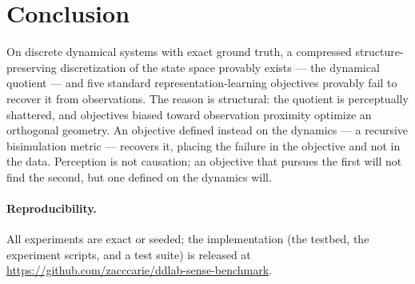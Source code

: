 \documentclass[11pt]{article}
\begin{document}
\section{Conclusion}

On discrete dynamical systems with exact ground truth, a compressed
structure-preserving discretization of the state space provably exists --- the
dynamical quotient --- and five standard representation-learning objectives
provably fail to recover it from observations. The reason is structural: the
quotient is perceptually shattered, and objectives biased toward observation
proximity optimize an orthogonal geometry. An objective defined instead on the
dynamics --- a recursive bisimulation metric --- recovers it, placing the
failure in the objective and not in the data. Perception is not causation; an
objective that pursues the first will not find the second, but one defined on
the dynamics will.

\paragraph{Reproducibility.}
All experiments are exact or seeded; the implementation (the testbed, the
experiment scripts, and a test suite) is released at
\url{https://github.com/zacccarie/ddlab-sense-benchmark}.



\end{document}
